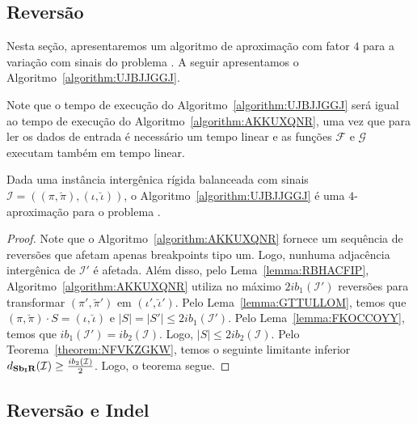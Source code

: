 \subsection{Reversão}

Nesta seção, apresentaremos um algoritmo de aproximação com fator $4$ para a variação com sinais do problema \SbIR{}. A seguir apresentamos o Algoritmo~\ref{algorithm:UJBJJGGJ}.



Note que o tempo de execução do Algoritmo~\ref{algorithm:UJBJJGGJ} será igual ao tempo de execução do Algoritmo~\ref{algorithm:AKKUXQNR}, uma vez que para ler os dados de entrada é necessário um tempo linear e as funções $\mathcal{F}$ e $\mathcal{G}$ executam também em tempo linear.

\begin{theorem}\label{theorem:DGTASCUU}
Dada uma instância intergênica rígida balanceada com sinais $\mathcal{I}=((\pi,\breve\pi),(\iota,\breve\iota))$, o Algoritmo~\ref{algorithm:UJBJJGGJ} é uma $4$-aproximação para o problema \SbIR{}.
\end{theorem}
\begin{proof}
Note que o Algoritmo~\ref{algorithm:AKKUXQNR} fornece um sequência de reversões que afetam apenas breakpoints tipo um. Logo, nunhuma adjacência intergênica de $\mathcal{I'}$ é afetada. Além disso, pelo Lema~\ref{lemma:RBHACFIP}, Algoritmo~\ref{algorithm:AKKUXQNR} utiliza no máximo $2ib_1(\mathcal{I'})$ reversões para transformar $(\pi',\breve\pi')$ em $(\iota',\breve\iota')$. Pelo Lema~\ref{lemma:GTTULLOM}, temos que $(\pi,\breve\pi) \cdot S = (\iota,\breve\iota)$ e $|S| = |S'| \le 2ib_1(\mathcal{I'})$. Pelo Lema~\ref{lemma:FKOCCOYY}, temos que $ib_1(\mathcal{I'}) = ib_2(\mathcal{I})$. Logo, $|S| \le 2ib_2(\mathcal{I})$. Pelo Teorema~\ref{theorem:NFVKZGKW}, temos o seguinte limitante inferior $d_{\textbf{Sb\textsubscript{I}R}}(\mathcal{I}) \ge \frac{ib_2(\mathcal{I})}{2}$. Logo, o teorema segue.
\end{proof}

\subsection{Reversão e Indel}

